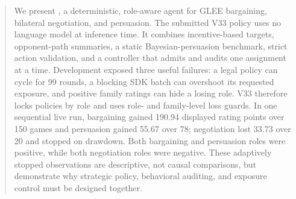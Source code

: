\begin{abstract}
We present \AgentName, a deterministic, role-aware agent for GLEE bargaining,
bilateral negotiation, and persuasion. The submitted V33 policy uses no
language model at inference time. It combines incentive-based targets,
opponent-path summaries, a static Bayesian-persuasion benchmark, strict action
validation, and a controller that admits and audits one assignment at a time.
Development exposed three useful failures: a legal policy can cycle for 99
rounds, a blocking SDK batch can overshoot its requested exposure, and positive
family ratings can hide a losing role. V33 therefore locks policies by role and
uses role- and family-level loss guards. In one sequential live run, bargaining
gained 190.94 displayed rating points over 150 games and persuasion gained
55.67 over 78; negotiation lost 33.73 over 20 and stopped on drawdown. Both
bargaining and persuasion roles were positive, while both negotiation roles
were negative. These adaptively stopped observations are descriptive, not
causal comparisons, but demonstrate why strategic policy, behavioral auditing,
and exposure control must be designed together.
\end{abstract}
